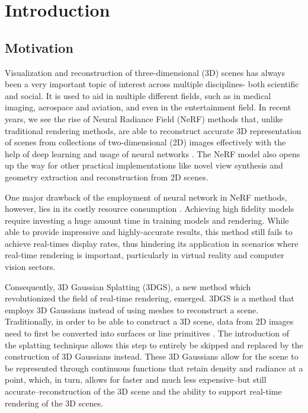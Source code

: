 
\chapter{Introduction}\label{chapter:introduction}

\section{Motivation}

Visualization and reconstruction of three-dimensional (3D) scenes has always been a very important topic of interest across multiple disciplines- both scientific and social. It is used to aid in multiple different fields, such as in medical imaging, aerospace and aviation, and even in the entertainment field. In recent years, we see the rise of Neural Radiance Field (NeRF) methods that, unlike traditional rendering methods, are able to reconstruct accurate 3D representation of scenes from collections of two-dimensional (2D) images effectively with the help of deep learning and usage of neural networks \parencite{nerf}. The NeRF model also opens up the way for other practical implementations like novel view synthesis and geometry extraction and reconstruction from 2D scenes.

One major drawback of the employment of neural network in NeRF methods, however, lies in its costly resource consumption \parencite{TensoRF}. Achieving high fidelity models require investing a huge amount time in training models and rendering. While able to provide impressive and highly-accurate results, this method still fails to achieve real-times display rates, thus hindering its application in scenarios where real-time rendering is important, particularly in virtual reality and computer vision sectors.

Consequently, 3D Gaussian Splatting (3DGS), a new method which revolutionized the field of real-time rendering, emerged. 3DGS is a method that employs 3D Gaussians \parencite{3DGS} instead of using meshes to reconstruct a scene. Traditionally, in order to be able to construct a 3D scene, data from 2D images need to first be converted into surfaces or line primitives \parencite{mvsformer} \parencite{pointsetgeneration} \parencite{SkeletonMesh}. The introduction of the splatting technique allows this step to entirely be skipped and replaced by the construction of 3D Gaussians instead. These 3D Gaussians allow for the scene to be represented through continuous functions that retain density and radiance at a point, which, in turn, allows for faster and much less expensive--but still accurate--reconstruction of the 3D scene and the ability to support real-time rendering of the 3D scenes.

